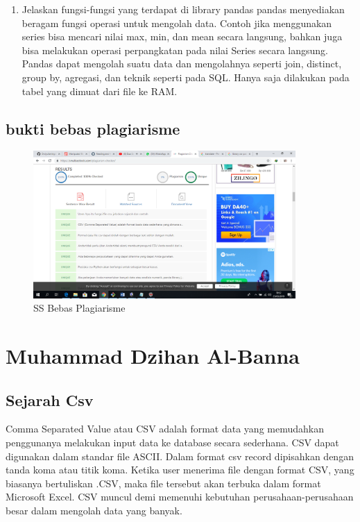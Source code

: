 \begin{enumerate}
\item Jelaskan fungsi-fungsi yang terdapat di library pandas
pandas menyediakan beragam fungsi operasi untuk mengolah data. Contoh jika menggunakan series bisa mencari nilai max, min, dan mean secara langsung, bahkan juga bisa melakukan operasi perpangkatan pada nilai Series secara langsung.
Pandas dapat mengolah suatu data dan mengolahnya seperti join, distinct, group by, agregasi, dan teknik seperti pada SQL. Hanya saja dilakukan pada tabel yang dimuat dari file ke RAM.
\end{enumerate}

\subsection{bukti bebas plagiarisme}
\begin{figure}[H]
\centering
\includegraphics[width=10cm]{figures/yuli.png}
\caption{SS Bebas Plagiarisme}
\label{dwiyul}
\end{figure}

\section{Muhammad Dzihan Al-Banna}
\subsection{Sejarah Csv}
Comma Separated Value atau CSV adalah format data yang memudahkan penggunanya melakukan input data ke database secara sederhana. CSV dapat digunakan dalam standar file ASCII. Dalam format csv record dipisahkan dengan tanda koma atau titik koma. Ketika user menerima file dengan format CSV, yang biasanya bertuliskan .CSV, maka file tersebut akan terbuka dalam format Microsoft Excel. CSV muncul demi memenuhi kebutuhan perusahaan-perusahaan besar dalam mengolah data yang banyak.

